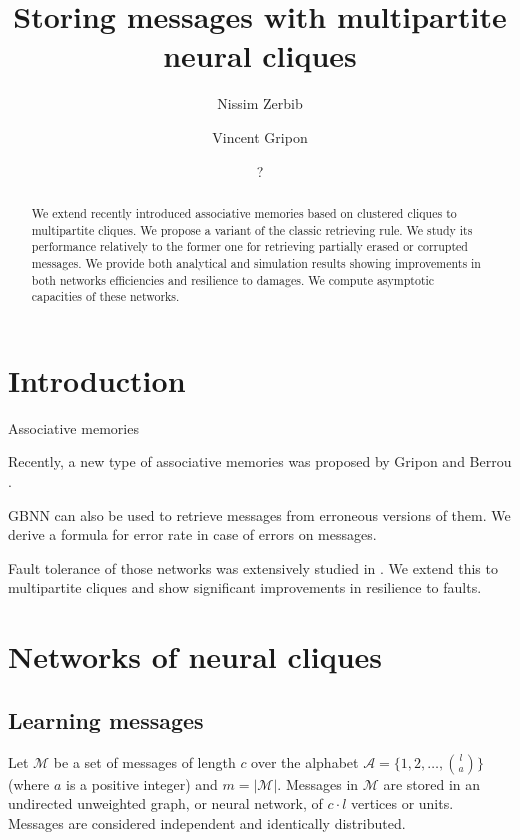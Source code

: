 \documentclass[english,11pt,twocolumn]{IEEEtran}
\title{Storing messages with multipartite neural cliques}
\author[]{Nissim Zerbib}
\affil{Département d'Informatique, École normale supérieure, Paris, France}
\author[]{Vincent Gripon}
\affil{Département d'Électronique, Télécom Bretagne, Brest, France}
\author{?}
\date{
	}
\theoremstyle{definition}
\begin{document}
	\maketitle

	 \begin{abstract}
	 	We extend recently introduced associative memories based on clustered cliques to multipartite cliques. We propose a variant of the classic retrieving rule. We study its performance relatively to the former one for retrieving partially erased or corrupted messages. We provide both analytical and simulation results showing improvements in both networks efficiencies and resilience to damages. We compute asymptotic capacities of these networks.
	 \end{abstract}
	 
	
	\section{Introduction}
	
		
		Associative memories
		
		Recently, a new type of associative memories was proposed by Gripon and Berrou \cite{GriBer20117}.
		
		GBNN can also be used to retrieve messages from erroneous versions of them. We derive a formula for error rate in case of errors on messages.
		
		Fault tolerance of those networks was extensively studied in \cite{LedGriRabGro20145}. We extend this to multipartite cliques and show significant improvements in resilience to faults.
	
	
	\section{Networks of neural cliques}
		
	\subsection{Learning messages}
		
	Let $\mathcal{M}$ be a set of messages of length $c$ over the alphabet $\mathcal{A} = \{1, 2, \hdots, {l \choose a}\}$ (where $a$ is a positive integer) and $m = | \mathcal{M} |$. Messages in $\mathcal{M}$ are stored in an undirected unweighted graph, or neural network, of $c \cdot l$ vertices or units. Messages are considered independent and identically distributed.
	
\end{document}
